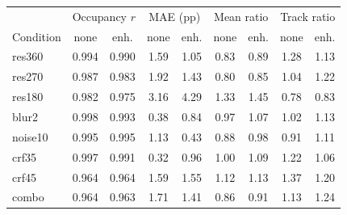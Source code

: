 \begin{tabular}{@{}lcccccccc@{}}
\toprule
 & \multicolumn{2}{c}{Occupancy $r$} & \multicolumn{2}{c}{MAE (pp)} & \multicolumn{2}{c}{Mean ratio} & \multicolumn{2}{c}{Track ratio} \\
Condition & none & enh. & none & enh. & none & enh. & none & enh. \\
\midrule
res360 & 0.994 & 0.990 & 1.59 & 1.05 & 0.83 & 0.89 & 1.28 & 1.13 \\
res270 & 0.987 & 0.983 & 1.92 & 1.43 & 0.80 & 0.85 & 1.04 & 1.22 \\
res180 & 0.982 & 0.975 & 3.16 & 4.29 & 1.33 & 1.45 & 0.78 & 0.83 \\
blur2 & 0.998 & 0.993 & 0.38 & 0.84 & 0.97 & 1.07 & 1.02 & 1.13 \\
noise10 & 0.995 & 0.995 & 1.13 & 0.43 & 0.88 & 0.98 & 0.91 & 1.11 \\
crf35 & 0.997 & 0.991 & 0.32 & 0.96 & 1.00 & 1.09 & 1.22 & 1.06 \\
crf45 & 0.964 & 0.964 & 1.59 & 1.55 & 1.12 & 1.13 & 1.37 & 1.20 \\
combo & 0.964 & 0.963 & 1.71 & 1.41 & 0.86 & 0.91 & 1.13 & 1.24 \\
\bottomrule
\end{tabular}
